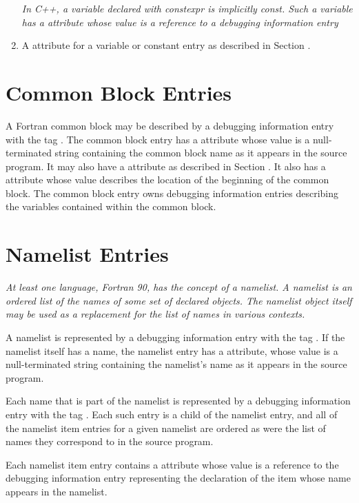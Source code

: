 \begin{enumerate}[1.]
\textit{In C++,
a variable declared with constexpr is implicitly const. Such a
variable has a  attribute whose value is a reference
to a debugging information entry}

\item A  attribute for a 
variable or constant entry as described in 
Section .

\end{enumerate}

\section{Common Block Entries}
\label{chap:commonblockentries}
A Fortran common block may be described by a debugging
information entry with the 
tag . 
The
common block entry has a  attribute whose value
is a null-terminated string containing the common block
name as it appears in the source program. It may also have a
 attribute as described in 
Section . 
It
also has a  attribute whose value describes the
location of the beginning of the common block. The common
block entry owns debugging information entries describing
the variables contained within the common block.

\section{Namelist Entries}
\label{chap:namelistentries}
\textit{At least one language, Fortran 90, has the concept of a
namelist. A namelist is an ordered list of the names of some
set of declared objects. The namelist object itself may be used
as a replacement for the list of names in various contexts.}

A namelist is represented by a debugging information entry
with the 
tag . 
If the namelist itself has a
name, the namelist entry has a  attribute, whose
value is a null-terminated string containing the namelist’s
name as it appears in the source program.

Each name that is part of the namelist is represented
by a debugging information entry with the tag
. 
Each such entry is a child of the
namelist entry, and all of the namelist item entries for a
given namelist are ordered as were the list of names they
correspond to in the source program.

Each namelist item entry contains a 
attribute whose value is a reference to the debugging
information entry representing the declaration of the item
whose name appears in the namelist.



